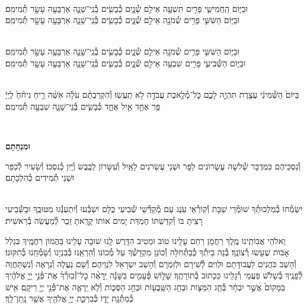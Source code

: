 \documentclass[twoside, openany, parskip=half, 11pt]{book}
\begin{document}
 \\
וּבַיּ֧וֹם הַֽחֲמִישִׁ֛י פָּרִ֥ים תִּשְׁעָ֖ה אֵילִ֣ם שְׁ֯נָ֑יִם כְּ֯בָשִׂ֧ים בְּ֯נֵֽי־שָׁנָ֛ה אַרְבָּעָ֥ה עָשָׂ֖ר תְּ֯מִימִֽם׃
\\
וּבַיּ֧וֹם הַשִּׁשִּׁ֛י פָּרִ֥ים שְׁ֯מֹנָ֖ה אֵילִ֣ם שְׁ֯נָ֑יִם כְּ֯בָשִׂ֧ים בְּ֯נֵֽי־שָׁנָ֛ה אַרְבָּעָ֥ה עָשָׂ֖ר תְּ֯מִימִֽם׃



 \\
וּבַיּ֧וֹם הַשִּׁשִּׁ֛י פָּרִ֥ים שְׁ֯מֹנָ֖ה אֵילִ֣ם שְׁ֯נָ֑יִם כְּ֯בָשִׂ֧ים בְּ֯נֵֽי־שָׁנָ֛ה אַרְבָּעָ֥ה עָשָׂ֖ר תְּ֯מִימִֽם׃
\\
וּבַיּ֧וֹם הַשְּׁ֯בִיעִ֛י פָּרִ֥ים שִׁבְעָ֖ה אֵילִ֣ם שְׁ֯נָ֑יִם כְּ֯בָשִׂ֧ים בְּ֯נֵֽי־שָׁנָ֛ה אַרְבָּעָ֥ה עָשָׂ֖ר תְּ֯מִימִֽם׃



\\
בַּיּוֹם֙ הַשְּׁ֯מִינִ֔י עֲצֶ֖רֶת תִּהְיֶ֣ה לָכֶ֑ם כׇּל־מְ֯לֶ֥אכֶת עֲבֹדָ֖ה לֹ֥א תַֽעֲשֽׂוּ׃ וְ֯הִקְרַבְתֶּ֨ם עֹלָ֜ה אִשֵּׁ֨ה רֵ֤יחַ נִיחֹ֨חַ֙ לַֽיְיָ֔ פַּ֥ר אֶחָ֖ד אַ֣יִל אֶחָ֑ד כְּ֯בָשִׂ֧ים בְּ֯נֵֽי־שָׁנָ֛ה שִׁבְעָ֖ה תְּ֯מִימִֽם׃

\\ \label{uminchasam}
\begin{Large}\textbf{וּמִנְחָתָם}\end{Large}
וְ֯נִסְכֵּיהֶם כִּמְדֻבָּר שְׁ֯לֹשָׁה עֶשְׂרוֹנִים לַפָּר וּשְׁנֵי עֶשְׂרֹנִים לָאָֽיִל וְ֯עִשָּׂרוֹן לַכֶּֽבֶשׂ וְ֯יַֽיִן כְּ֯נִסְכּוֹ׃ וְ֯שָׂעִיר לְ֯כַפֵּר וּשְׁנֵי תְ֯מִידִים כְּ֯הִלְכָתָם׃

\begin{sometimes}

\shabbos\\
יִשְׂמְ֯חוּ בְ֯מַלְכוּתְ֯ךָ שׁוֹמְ֯רֵי שַׁבָּת וְ֯קֽוֹרְ֯אֵי עֹֽנֶג עַם מְ֯קַדְּ֯שֵׁי שְׁ֯בִיעִי כֻּלָּם יִשְׂבְּ֯עוּ וְ֯יִתְעַנְּ֯גוּ מִטּוּבֶֽךָ וּבַשְּׁ֯בִיעִי רָצִֽיתָ בּוֹ וְ֯קִדַּשְׁתּוֹ חֶמְדַּת יָמִים אוֹתוֹ קָרָֽאתָ זֵֽכֶר לְ֯מַעֲשֵׂה בְ֯רֵאשִׁית׃

\end{sometimes}

\enlargethispage{\baselineskip}
וֵאלֹהֵי אֲבוֹתֵֽינוּ מֶֽלֶךְ רַחֲמָן רַחֵם עָלֵֽינוּ טוֹב וּמֵטִיב הִדָּֽרֶשׁ לָֽנוּ שׁוּבָה עָלֵֽינוּ בַּהֲמוֹן רַחֲמֶֽיךָ בִּגְלַל אָבוֹת שֶׁעָשׂוּ רְ֯צוֹנֶֽךָ׃ בְּ֯נֵה בֵיתְ֯ךָ כְּ֯בַתְּ֯חִלָּה וְ֯כוֹנֵן מִקְדָשְׁ֯ךָ עַל מְ֯כוֹנוֹ וְ֯הַרְאֵֽנוּ בְּ֯בִנְיָנוֹ וְ֯שַׂמְּ֯חֵֽנוּ בְּ֯תִקּוּנוֹ׃ וְ֯הָשֵׁב כֹּהֲנִים לַעֲבוֹדָתָם וּלְוִיִּם לְ֯שִׁירָם וּלְזִמְרָם וְ֯הָשֵׁב יִשְׂרָאֵל לִנְוֵיהֶם׃ וְ֯שָׁם נַעֲלֶה וְ֯נֵרָאֶה וְ֯נִשְׁתַּחֲוֶה לְ֯פָנֶֽיךָ בְּ֯שָׁלֹֹשׁ פַּעֲמֵי רְ֯גָלֵֽינוּ כַּכָּתוּב בְּ֯תוֹרָתֶֽךָ׃ שָׁל֣וֹשׁ פְּ֯עָמִ֣ים בַּשָּׁנָ֡ה יֵֽרָאֶ֨ה כׇל־זְ֯כֽוּרְ֯ךָ֜ אֶת־פְּ֯נֵ֣י יְיָ֣ אֱלֹהֶ֗יךָ בַּמָּקוֹם֙ אֲשֶׁ֣ר יִבְחָ֔ר בְּ֯חַ֧ג הַמַּצּ֛וֹת וּבְחַ֥ג הַשָּֽׁבֻע֖וֹת וּבְחַ֣ג הַסֻּכּ֑וֹת וְ֯לֹ֧א יֵֽרָאֶ֛ה אֶת־פְּ֯נֵ֥י יְיָ֖ רֵיקָֽם׃ אִ֖ישׁ כְּ֯מַתְּ֯נַֽת יָד֑וֹ כְּ֯בִרְכַּ֛ת יְיָ֥ אֱלֹהֶ֖יךָ אֲשֶׁ֥ר נָֽתַן־לָֽךְ׃
\end{document}
